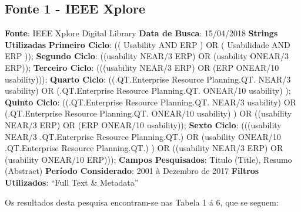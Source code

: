\subsection{Fonte 1 - IEEE Xplore}\newline
\newline
\noindent \textbf{Fonte}: IEEE Xplore Digital Library\newline
\noindent \textbf{Data de Busca}: 15/04/2018\newline
\noindent \textbf{Strings Utilizadas}\newline
\indent \textbf{Primeiro Ciclo}: (( Usability AND ERP ) OR ( Usabilidade AND ERP ));\newline
\indent \textbf{Segundo  Ciclo}: ((usability NEAR/3 ERP) OR (usability ONEAR/3 ERP));\newline
\indent \textbf{Terceiro Ciclo}: (((usability NEAR/3 ERP) OR (ERP ONEAR/10 usability)));\newline
\indent \textbf{Quarto   Ciclo}: ((.QT.Enterprise Resource Planning.QT. NEAR/3 usability)  OR (.QT.Enterprise Resource Planning.QT. ONEAR/10 usability) );\newline
\indent \textbf{Quinto   Ciclo}: ((.QT.Enterprise Resource Planning.QT. NEAR/3 usability)  OR (.QT.Enterprise Resource Planning.QT. ONEAR/10 usability) ) OR ((usability NEAR/3 ERP) OR (ERP ONEAR/10 usability));\newline
\indent \textbf{Sexto    Ciclo}: (((usability NEAR/3 .QT.Enterprise Resource Planning.QT.) OR (usability ONEAR/10 .QT.Enterprise Resource Planning.QT.) ) OR ((usability NEAR/3 ERP) OR (usability ONEAR/10 ERP)));\newline
\newline
\noindent \textbf{Campos Pesquisados}: Titulo (Title), Resumo (Abstract) \newline
\noindent \textbf{Período Considerado}: 2001 à Dezembro de 2017 \newline
\noindent \textbf{Filtros Utilizados}: “Full Text & Metadata” \newline

Os resultados desta pesquisa encontram-se nas Tabela 1 á 6, que se seguem:







